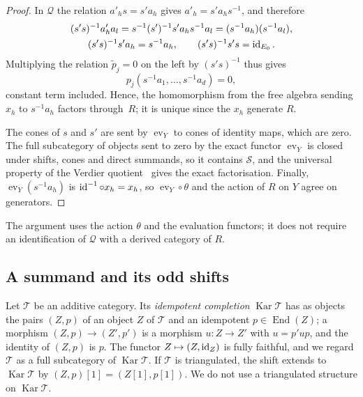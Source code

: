 \begin{proof}
  In $\mathcal{Q}$ the relation ${a'_hs=s'a_h}$ gives ${a'_h=s'a_hs^{-1}}$, and
  therefore
  \begin{gather*}
    (s's)^{-1}a'_ha_l=s^{-1}(s')^{-1}s'a_hs^{-1}a_l=(s^{-1}a_h)(s^{-1}a_l),\\
    (s's)^{-1}s'a_h=s^{-1}a_h,\qquad(s's)^{-1}s's=\id[E_0].
  \end{gather*}
  Multiplying the relation ${\widetilde{p}_j=0}$ on the left by $(s's)^{-1}$
  thus gives
  \[
    p_j(s^{-1}a_1,\dots,s^{-1}a_d)=0,
  \]
  constant term included. Hence,
  the homomorphism from the free algebra sending $x_h$ to $s^{-1}a_h$ factors
  through~$R$; it is unique since the $x_h$ generate $R$.

  The cones of $s$ and $s'$ are sent by $\operatorname{ev}_Y$ to cones of
  identity maps, which are zero. The full subcategory of objects sent to zero
  by the exact functor $\operatorname{ev}_Y$ is closed under shifts, cones
  and direct summands, so it contains $\mathcal{S}$, and the universal property
  of the Verdier quotient~\cite[Tag~05RJ, Lemma~13.6.8]{Stacks} gives the
  exact factorisation. Finally, $\operatorname{ev}_Y(s^{-1}a_h)$ is
  ${\id^{-1}\circ x_h=x_h}$, so ${\operatorname{ev}_Y\circ\theta}$ and the action
  of $R$ on $Y$ agree on generators.
\end{proof}

The argument uses the action $\theta$ and the evaluation functors; it does not
require an identification of $\mathcal Q$ with a derived category of $R$.

\subsection{A summand and its odd shifts}
\label{subsec:odd-double}

Let $\mathcal{T}$ be an additive category. Its \emph{idempotent completion}
$\operatorname{Kar}\mathcal{T}$ has as objects the pairs $(Z,p)$ of an object
$Z$ of $\mathcal{T}$ and an idempotent ${p\in\operatorname{End}(Z)}$; a morphism
${(Z,p)\to(Z',p')}$ is a morphism ${u\colon Z\to Z'}$ with ${u=p'up}$, and the
identity of $(Z,p)$ is $p$. The functor ${Z\mapsto(Z,\id[Z])}$ is fully faithful,
and we regard $\mathcal{T}$ as a full subcategory of
$\operatorname{Kar}\mathcal{T}$. If $\mathcal{T}$ is triangulated, the shift
extends to $\operatorname{Kar}\mathcal{T}$ by ${(Z,p)[1]=(Z[1],p[1])}$. We do not
use a triangulated structure on $\operatorname{Kar}\mathcal{T}$.

